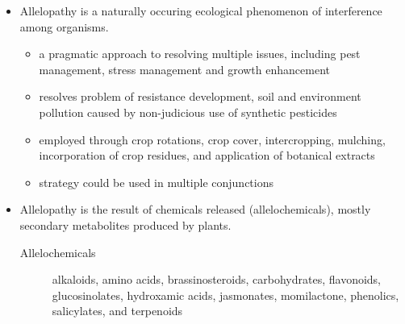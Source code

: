\documentclass[11pt,dvipsnames,ignorenonframetext,aspectratio=169]{beamer}
\providecommand{\tightlist}{%
  \setlength{\itemsep}{0pt}\setlength{\parskip}{0pt}}
\newcommand{\bdescription}{\begin{description}}
\newcommand{\edescription}{\end{description}}
\begin{document}
\begin{frame}{}
\protect\hypertarget{section-9}{}
\begin{itemize}
\tightlist
\item
  Allelopathy is a naturally occuring ecological phenomenon of
  interference among organisms.

  \begin{itemize}
  \tightlist
  \item
    a pragmatic approach to resolving multiple issues, including pest
    management, stress management and growth enhancement
  \item
    resolves problem of resistance development, soil and environment
    pollution caused by non-judicious use of synthetic pesticides
  \item
    employed through crop rotations, crop cover, intercropping,
    mulching, incorporation of crop residues, and application of
    botanical extracts
  \item
    strategy could be used in multiple conjunctions
  \end{itemize}
\item
  Allelopathy is the result of chemicals released (allelochemicals),
  mostly secondary metabolites produced by plants. \bdescription

  \item[Allelochemicals]

  alkaloids, amino acids, brassinosteroids, carbohydrates, flavonoids,
  glucosinolates, hydroxamic acids, jasmonates, momilactone, phenolics,
  salicylates, and terpenoids \edescription
\end{itemize}
\end{frame}
\end{document}
